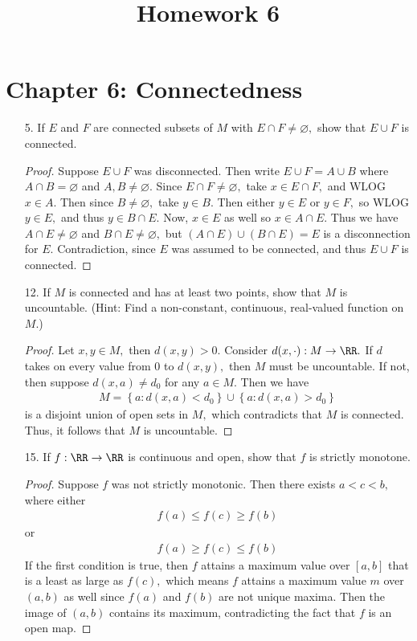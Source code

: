 \documentclass{article}
\begin{document}
\title{Homework 6}
\maketitle
\thispagestyle{fancy}

\section*{Chapter 6: Connectedness}

\begin{itemize}
	\item[5.] If $E$ and $F$ are connected subsets of $M$ with $E\cap F\neq\varnothing,$ show that $E\cup F$ is connected.
		\begin{proof}
			Suppose $E\cup F$ was disconnected. Then write $E\cup F=A\cup B$ where $A\cap B=\varnothing$ and $A, B\neq\varnothing.$ Since $E\cap F\neq\varnothing,$ take $x\in E\cap F,$ and WLOG $x\in A.$ Then since $B\neq\varnothing,$ take $y\in B.$ Then either $y\in E$ or $y\in F,$ so WLOG $y\in E,$ and thus $y\in B\cap E.$ Now, $x\in E$ as well so $x\in A\cap E.$ Thus we have $A\cap E\neq \varnothing$ and $B\cap E\neq\varnothing,$ but $(A\cap E)\cup (B\cap E) = E$ is a disconnection for $E.$ Contradiction, since $E$ was assumed to be connected, and thus $E\cup F$ is connected.
		\end{proof}

	\item[12.] If $M$ is connected and has at least two points, show that $M$ is uncountable. (Hint: Find a non-constant, continuous, real-valued function on $M.$)
		\begin{proof}
			Let $x, y\in M,$ then $d(x, y)>0.$ Consider $d(x, \cdot):M\to\RR.$ If $d$ takes on every value from $0$ to $d(x, y),$ then $M$ must be uncountable. If not, then suppose $d(x, a)\neq d_0$ for any $a\in M.$ Then we have
			\begin{align*}
				M = \left\{ a:d(x, a)<d_0 \right\} \cup \left\{ a:d(x, a)>d_0 \right\}
			\end{align*}
			is a disjoint union of open sets in $M,$ which contradicts that $M$ is connected. Thus, it follows that $M$ is uncountable.
		\end{proof}

	\item[15.] If $f:\RR\to\RR$ is continuous and open, show that $f$ is strictly monotone.
		\begin{proof}
			Suppose $f$ was not strictly monotonic. Then there exists $a<c<b,$ where either
			\begin{align*}
				f(a)\le f(c)\ge f(b)
			\end{align*}
			or 
			\begin{align*}
				f(a)\ge f(c)\le f(b)
			\end{align*}
			If the first condition is true, then $f$ attains a maximum value over $[a, b]$ that is a least as large as $f(c),$ which means $f$ attains a maximum value $m$ over $(a, b)$ as well since $f(a)$ and $f(b)$ are not unique maxima. Then the image of $(a, b)$ contains its maximum, contradicting the fact that $f$ is an open map.


\end{proof}
\end{itemize}
\end{document}
